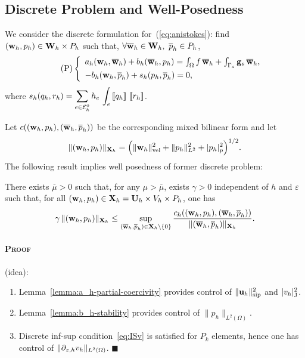 \documentclass[25pt, a0paper, portrait, leqno, margin=0mm, innermargin=25mm,
blockverticalspace=15mm, colspace=15mm, subcolspace=8mm]{tikzposter}
\begin{document}
{\begin{multicols*}{3}
    \section{\color{colorTwo}Discrete Problem and Well-Posedness \dotfill}

    We consider the discrete formulation for~(\ref{eq:anistokes}):
    find $(\mathbf{w}_{h}, p_{h}) \in \mathbf{W}_h \times P_h$ such that, $\forall \overline{\mathbf{w}}_h\in\mathbf{W}_h,\ \overline{p}_h\in P_h$,
    \begin{equation}
      \tag{P}
      \label{disc-var-pb}
      \left \{
        \begin{array}{l}
          a_h ( \wh, \bwh) +b_h ( \bwh, \ph ) = \int_{\Omega} f \, \bwh + \int_{\Gamma_s} \gs \, \bwh,
          \\
          \noalign{\smallskip}
          -b_h (\wh, \bph) + s_h (\ph, \bph)=0,
        \end{array} \right.
    \end{equation}
    where
    $s_h (q_{h}, r_h)= \displaystyle \sum_{e\in{\cal E}_h^0} h_e \, \int_e
    \left[\!\left[q_{h}\right]\!\right] \, \left[\!\left[r_h\right]\!\right]$.

    Let $c((\mathbf{w}_{h},p_{h}),(\overline{\mathbf{w}}_h,\overline{p}_h))$ be the corresponding mixed bilinear
    form and let
    $$ \| (\mathbf{w}_{h}, p_{h})\|_{\mathbf{X}_h} = \Big ( \|{\bf w}_h\|_{\mathrm{vel}}^2 + \| p_{h} \|_{L^2}^2 +
    |p_{h}|_p^2\Big ) ^{1/2}.
    $$
    The following result implies well posedness of former
    discrete problem:
    \begin{theorem}
      \label{thm:discrete-inf-sup-stability}
      There exists $\overline{\mu}>0$ such that, for any
      $ \mu > \overline{\mu}$, exists $\gamma >0$
      independent of $h$ and $\varepsilon$ such that, for all
      $(\mathbf{w}_{h}, p_{h}) \in \mathbf{X}_h= \mathbf{U}_h\times V_h\times P_h$, one has
      $$
      \gamma \,\| (\mathbf{w}_{h}, p_{h})\|_{\mathbf{X}_h}\le \sup_{(\overline{\mathbf{w}}_h,\overline{p}_h)\in \mathbf{X}_h
        \setminus \{0\}} \frac{c_h ( (\mathbf{w}_{h}, p_{h}), (\overline{\mathbf{w}}_h,\overline{p}_h) )}
      {\|(\overline{\mathbf{w}}_h,\overline{p}_h)\|_{\mathbf{X}_h} }.
      $$
    \end{theorem}
    \paragraph{\textsc{Proof}}(idea):
    \begin{enumerate}
    \item Lemma~\ref{lemma:a_h-partial-coercivity} provides control of
      $\|\mathbf{u}_{h}\|_{\mathrm{sip}}^2$ and $|v_{h}|_{\mathrm{J}}^2$.
    \item Lemma~\ref{lemma:b_h-stability} provides control of
      $\|p_h\|_{L^2(\Omega)}$.
    \item Discrete inf-sup condition~\ref{eq:ISv} is satisfied for
      $P_k$ elements, hence one has control of
      $\|\partial_{z,h} v_{h}\|_{L^2(\Omega)}$.
     \hfill$\blacksquare$
    \end{enumerate}
  \end{multicols*}
}
\end{document}
